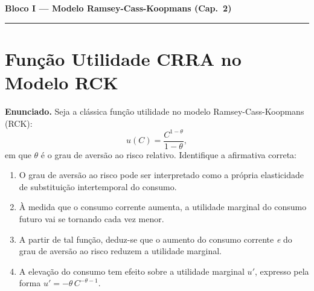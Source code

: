 \documentclass[12pt, a4paper]{article}
\begin{document}
\newpage
\begin{center}
{\large\bfseries\color{cyanrbc} Bloco I --- Modelo Ramsey-Cass-Koopmans (Cap.\ 2)}\\[0.2em]
\rule{\linewidth}{0.6pt}
\end{center}

\setcounter{section}{0}

\section{Função Utilidade CRRA no Modelo RCK}

\textbf{Enunciado.} Seja a clássica função utilidade no modelo Ramsey-Cass-Koopmans (RCK):
\[
u(C) = \frac{C^{1-\theta}}{1-\theta},
\]
em que $\theta$ é o grau de aversão ao risco relativo. Identifique a afirmativa correta:

\begin{enumerate}[label=\alph*)]
\item O grau de aversão ao risco pode ser interpretado como a própria elasticidade de substituição intertemporal do consumo.
\item À medida que o consumo corrente aumenta, a utilidade marginal do consumo futuro vai se tornando cada vez menor.
\item A partir de tal função, deduz-se que o aumento do consumo corrente \emph{e} do grau de aversão ao risco reduzem a utilidade marginal.
\item A elevação do consumo tem efeito sobre a utilidade marginal $u'$, expresso pela forma $u' = -\theta\, C^{-\theta-1}$.
\end{enumerate}
\end{document}
